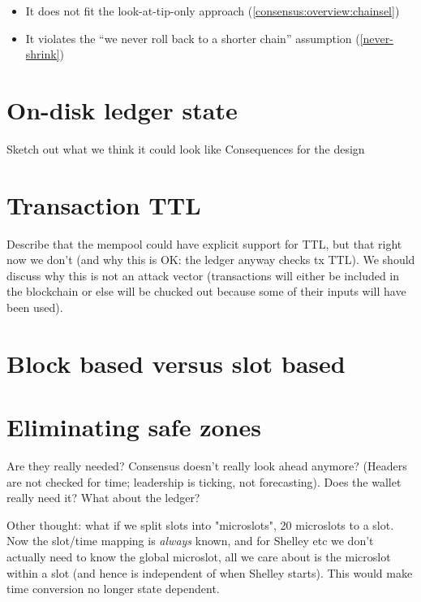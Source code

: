 \begin{itemize}
\item It does not fit the look-at-tip-only approach
(\cref{consensus:overview:chainsel})
\item It violates the ``we never roll back to a shorter chain'' assumption
(\cref{never-shrink})
\end{itemize}






\section{On-disk ledger state}

\duncan

Sketch out what we think it could look like
Consequences for the design

\section{Transaction TTL}
\label{future:ttl}

Describe that the mempool could have explicit support for TTL, but that right now we don't (and why this is OK: the ledger anyway checks tx TTL). We should discuss why this is not an attack vector (transactions will either be included in the blockchain or else will be chucked out because some of their inputs will have been used).

\section{Block based versus slot based}
\label{future:block-vs-slot}

\section{Eliminating safe zones}
\label{future:eliminating-safezones}

Are they really needed? Consensus doesn't really look ahead anymore?
(Headers are not checked for time; leadership is ticking, not forecasting).
Does the wallet really need it? What about the ledger?

Other thought: what if we split slots into "microslots", 20 microslots to a
slot. Now the slot/time mapping is \emph{always} known, and for Shelley etc
we don't actually need to know the global microslot, all we care about is
the microslot within a slot (and hence is independent of when Shelley starts).
This would make time conversion no longer state dependent.

